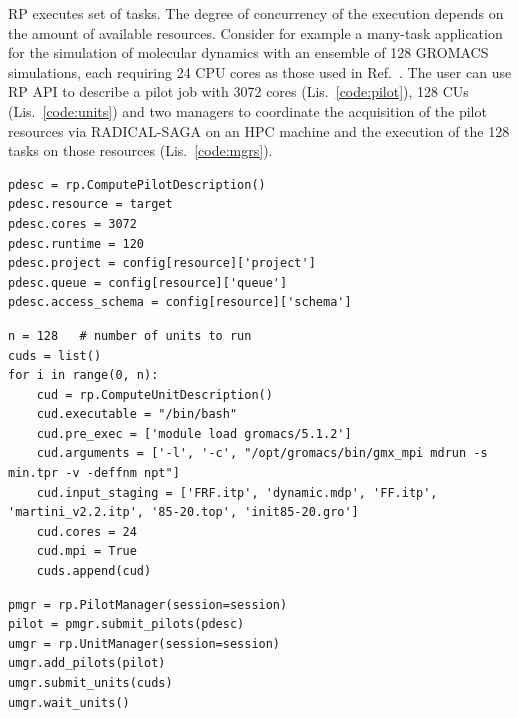 \documentclass[preprint,12pt, a4paper]{elsarticle}
\begin{document}
RP executes set of tasks. The degree of concurrency of the execution depends
on the amount of available resources. Consider for example a many-task
application for the simulation of molecular dynamics with an ensemble of 128
GROMACS simulations, each requiring 24 CPU cores as those used in
Ref.~\cite{balasubramanian2016extasy}. The user can use RP API to describe a
pilot job with 3072 cores (Lis.~\ref{code:pilot}), 128 CUs
(Lis.~\ref{code:units}) and two managers to coordinate the acquisition of the
pilot resources via RADICAL-SAGA on an HPC machine and the execution of the
128 tasks on those resources (Lis.~\ref{code:mgrs}).

\begin{lstlisting}
pdesc = rp.ComputePilotDescription()        
pdesc.resource = target
pdesc.cores = 3072
pdesc.runtime = 120
pdesc.project = config[resource]['project']
pdesc.queue = config[resource]['queue']
pdesc.access_schema = config[resource]['schema']
\end{lstlisting}

\begin{lstlisting}
n = 128   # number of units to run
cuds = list()
for i in range(0, n):
    cud = rp.ComputeUnitDescription()
    cud.executable = "/bin/bash"
    cud.pre_exec = ['module load gromacs/5.1.2']
    cud.arguments = ['-l', '-c', "/opt/gromacs/bin/gmx_mpi mdrun -s min.tpr -v -deffnm npt"]
    cud.input_staging = ['FRF.itp', 'dynamic.mdp', 'FF.itp', 'martini_v2.2.itp', '85-20.top', 'init85-20.gro'] 
    cud.cores = 24
    cud.mpi = True    
    cuds.append(cud)
\end{lstlisting}

\begin{lstlisting}
pmgr = rp.PilotManager(session=session)
pilot = pmgr.submit_pilots(pdesc)
umgr = rp.UnitManager(session=session)
umgr.add_pilots(pilot)
umgr.submit_units(cuds)
umgr.wait_units()
\end{lstlisting}
\end{document}
